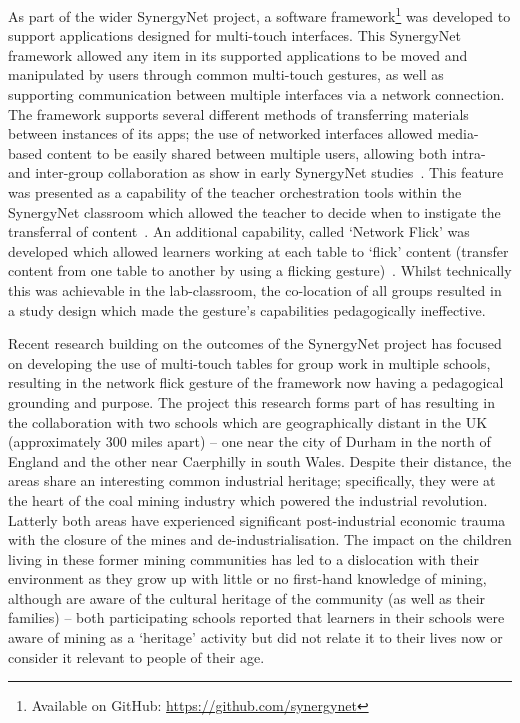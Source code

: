 \documentclass[a4paper,11pt]{article}
\begin{document}
As part of the wider SynergyNet project, a software framework\footnote{Available on GitHub: \url{https://github.com/synergynet}} was developed to support applications designed for multi-touch interfaces.
This SynergyNet framework allowed any item in its supported applications to be moved and manipulated by users through common multi-touch gestures, as well as supporting communication between multiple interfaces via a network connection.
The framework supports several different methods of transferring materials between instances of its apps; the use of networked interfaces allowed media-based content to be easily shared between multiple users, allowing both intra- and inter-group collaboration as show in early SynergyNet studies~\cite{mercier:2014b}.
This feature was presented as a capability of the teacher orchestration tools within the SynergyNet classroom which allowed the teacher to decide when to instigate the transferral of content~\cite{alagha-et-al:2010,mercier:2016}.
An additional capability, called `Network Flick' was developed which allowed learners working at each table to ‘flick’ content (transfer content from one table to another by using a flicking gesture)~\cite{reetz-et-al:2006}.
Whilst technically this was achievable in the lab-classroom, the co-location of all groups resulted in a study design which made the gesture’s capabilities pedagogically ineffective.

Recent research building on the outcomes of the SynergyNet project has focused on developing the use of multi-touch tables for group work in multiple schools, resulting in the network flick gesture of the framework now having a pedagogical grounding and purpose.
The project this research forms part of has resulting in the collaboration with two schools which are geographically distant in the UK (approximately 300 miles apart) -- one near the city of Durham in the north of England and the other near Caerphilly in south Wales.
Despite their distance, the areas share an interesting common industrial heritage; specifically, they were at the heart of the coal mining industry which powered the industrial revolution.
Latterly both areas have experienced significant post-industrial economic trauma with the closure of the mines and de-industrialisation.
The impact on the children living in these former mining communities has led to a dislocation with their environment as they grow up with little or no first-hand knowledge of mining, although are aware of the cultural heritage of the community (as well as their families) -- both participating schools reported that learners in their schools were aware of mining as a ‘heritage’ activity but did not relate it to their lives now or consider it relevant to people of their age.
\end{document}
